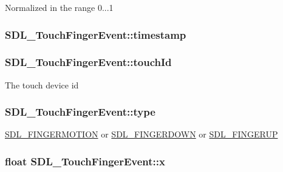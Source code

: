 Normalized in the range 0...1 \hypertarget{struct_s_d_l___touch_finger_event_abde2ab5cb013bbd21e37a65e2f8fa666}{
\subsubsection[{timestamp}]{ S\-D\-L\-\_\-\-Touch\-Finger\-Event\-::timestamp}}\label{struct_s_d_l___touch_finger_event_abde2ab5cb013bbd21e37a65e2f8fa666}
\hypertarget{struct_s_d_l___touch_finger_event_ad7a6f39ec9af1bf47b160d18314edd70}{
\subsubsection[{touch\-Id}]{ S\-D\-L\-\_\-\-Touch\-Finger\-Event\-::touch\-Id}}\label{struct_s_d_l___touch_finger_event_ad7a6f39ec9af1bf47b160d18314edd70}
The touch device id \hypertarget{struct_s_d_l___touch_finger_event_a3883218fa3426065ca66086c100edbfa}{
\subsubsection[{type}]{ S\-D\-L\-\_\-\-Touch\-Finger\-Event\-::type}}\label{struct_s_d_l___touch_finger_event_a3883218fa3426065ca66086c100edbfa}
\hyperlink{_s_d_l__events_8h_a3b589e89be6b35c02e0dd34a55f3fccaa1862d7d009ade2c79b2f1fe4a30c9dd2}{S\-D\-L\-\_\-\-F\-I\-N\-G\-E\-R\-M\-O\-T\-I\-O\-N} or \hyperlink{_s_d_l__events_8h_a3b589e89be6b35c02e0dd34a55f3fccaaa712d1fa8bb69f6042e24a31e835a9ec}{S\-D\-L\-\_\-\-F\-I\-N\-G\-E\-R\-D\-O\-W\-N} or \hyperlink{_s_d_l__events_8h_a3b589e89be6b35c02e0dd34a55f3fccaa8266a108a628cc698c5172e72c1fc1e6}{S\-D\-L\-\_\-\-F\-I\-N\-G\-E\-R\-U\-P} \hypertarget{struct_s_d_l___touch_finger_event_a0ce44b1342220fa17e9b9b4a77c2c906}{
\subsubsection[{x}]{\setlength{\rightskip}{0pt plus 5cm}float S\-D\-L\-\_\-\-Touch\-Finger\-Event\-::x}}\label{struct_s_d_l___touch_finger_event_a0ce44b1342220fa17e9b9b4a77c2c906}
